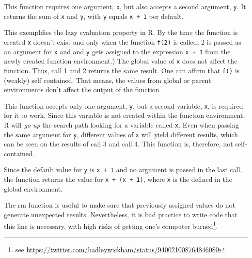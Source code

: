 \documentclass[12,]{article}
\providecommand{\tightlist}{%
  \setlength{\itemsep}{0pt}\setlength{\parskip}{0pt}}
\let\rmarkdownfootnote\footnote%
\def\footnote{\protect\rmarkdownfootnote}
\begin{document}
\begin{description}
\tightlist
\item[Call 1 and 2]
This function requires one argument, \texttt{x}, but also accepts a
second argument, \texttt{y}. It returns the sum of \texttt{x} and
\texttt{y}, with \texttt{y} equals \texttt{x\ +\ 1} per default.

This exemplifies the lazy evaluation property in R. By the time the
function is created \texttt{x} doesn't exist and only when the function
\texttt{f(2)} is called, 2 is passed as an argument for \texttt{x} and
and \texttt{y} gets assigned to the expression \texttt{x\ +\ 1} from the
newly created function environment.) The global value of \texttt{x} does
not affect the function. Thus, call 1 and 2 returns the same result. One
can affirm that \texttt{f()} is (weakly) self contained. That means, the
values from global or parent environments don't affect the output of the
function
\item[Call 3 and 4]
This function accepts only one argument, \texttt{y}, but a second
variable, \texttt{x}, is required for it to work. Since this variable is
not created within the function environment, R will \emph{go up} the
search path looking for a variable called \texttt{x}. Even when passing
the same argument for \texttt{y}, different values of \texttt{x} will
yield different results, which can be seen on the results of call 3 and
call 4. This function is, therefore, not self-contained.
\item[Call 5]
Since the default value for \texttt{y} is \texttt{x\ +\ 1} and no
argument is passed in the last call, the function returns the value for
\texttt{x\ +\ (x\ +\ 1)}, where \texttt{x} is the defined in the global
environment.
\item[rm function]
The rm function is useful to make sure that previously assigned values
do not generate unexpected results. Nevertheless, it is bad practice to
write code that this line is necessary, with high risks of getting one's
computer burned\footnote{see
  \url{https://twitter.com/hadleywickham/status/940021008764846080}}.
\end{description}
\end{document}
